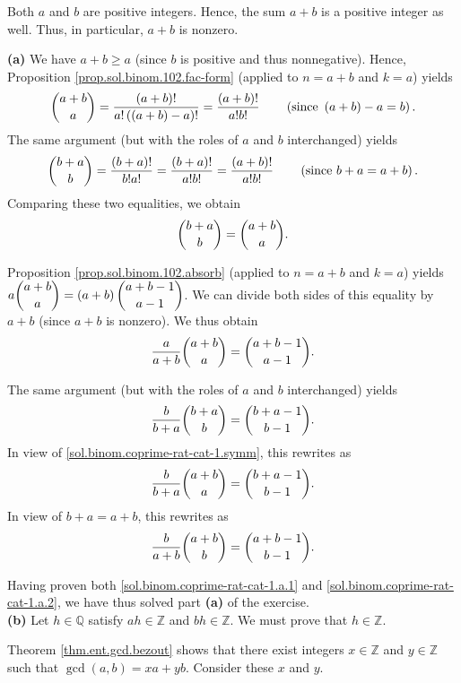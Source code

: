 \documentclass[paper=a4, fontsize=12pt]{scrartcl}%
\theoremstyle{plainsl}
\theoremstyle{definition}
\theoremstyle{remark}
\begin{document}
Both $a$ and $b$ are positive integers. Hence, the sum $a+b$ is a positive
integer as well. Thus, in particular, $a+b$ is nonzero.

\textbf{(a)} We have $a+b\geq a$ (since $b$ is positive and thus nonnegative).
Hence, Proposition \ref{prop.sol.binom.102.fac-form} (applied to $n=a+b$ and
$k=a$) yields
\[
\dbinom{a+b}{a}=\dfrac{\left(  a+b\right)  !}{a!\left(  \left(  a+b\right)
-a\right)  !}=\dfrac{\left(  a+b\right)  !}{a!b!}\qquad\left(  \text{since
}\left(  a+b\right)  -a=b\right)  .
\]
The same argument (but with the roles of $a$ and $b$ interchanged) yields
\[
\dbinom{b+a}{b}=\dfrac{\left(  b+a\right)  !}{b!a!}=\dfrac{\left(  b+a\right)
!}{a!b!}=\dfrac{\left(  a+b\right)  !}{a!b!}\qquad\left(  \text{since
}b+a=a+b\right)  .
\]
Comparing these two equalities, we obtain%
\begin{equation}
\dbinom{b+a}{b}=\dbinom{a+b}{a}. \label{sol.binom.coprime-rat-cat-1.symm}%
\end{equation}


Proposition \ref{prop.sol.binom.102.absorb} (applied to $n=a+b$ and $k=a$)
yields $a\dbinom{a+b}{a}=\left(  a+b\right)  \dbinom{a+b-1}{a-1}$. We can
divide both sides of this equality by $a+b$ (since $a+b$ is nonzero). We thus
obtain
\begin{equation}
\dfrac{a}{a+b}\dbinom{a+b}{a}=\dbinom{a+b-1}{a-1}.
\label{sol.binom.coprime-rat-cat-1.a.1}%
\end{equation}


The same argument (but with the roles of $a$ and $b$ interchanged) yields%
\[
\dfrac{b}{b+a}\dbinom{b+a}{b}=\dbinom{b+a-1}{b-1}.
\]
In view of \eqref{sol.binom.coprime-rat-cat-1.symm}, this rewrites as%
\[
\dfrac{b}{b+a}\dbinom{a+b}{a}=\dbinom{b+a-1}{b-1}.
\]
In view of $b+a=a+b$, this rewrites as%
\begin{equation}
\dfrac{b}{a+b}\dbinom{a+b}{b}=\dbinom{a+b-1}{b-1}.
\label{sol.binom.coprime-rat-cat-1.a.2}%
\end{equation}


Having proven both \eqref{sol.binom.coprime-rat-cat-1.a.1} and
\eqref{sol.binom.coprime-rat-cat-1.a.2}, we have thus solved part \textbf{(a)}
of the exercise. \\[0.4cm]

\textbf{(b)} Let $h\in\mathbb{Q}$ satisfy $ah\in\mathbb{Z}$ and $bh\in
\mathbb{Z}$. We must prove that $h\in\mathbb{Z}$.

Theorem \ref{thm.ent.gcd.bezout} shows that there exist integers
$x\in\mathbb{Z}$ and $y\in\mathbb{Z}$ such that $\gcd\left(  a,b\right)
=xa+yb$. Consider these $x$ and $y$.
\end{document}
